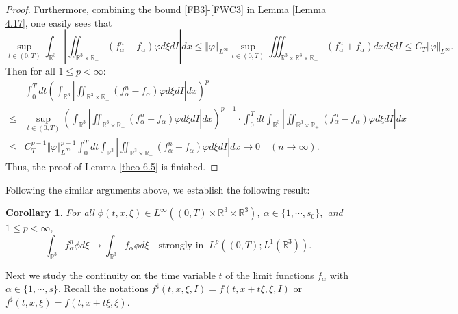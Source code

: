 \documentclass[reqno,11pt]{amsart}
\newtheorem{corollary}{Corollary}[section]
\numberwithin{equation}{section}
\def\R{\mathbb{R}}
\begin{document}
\begin{proof}
Furthermore, combining the bound \eqref{FB3}-\eqref{FWC3} in Lemma \ref{Lemma 4.17}, one easily sees that
	\begin{equation*}
		\sup_{t \in (0, T)} \int_{\R^3} |\iint_{ \R^3 \times \R_+} (f^n_\alpha -f_\alpha )\varphi d\xi dI|dx \leq \Vert \varphi \Vert_{L^\infty} \sup_{t \in (0, T)} \iiint_{ \R^3\times \R^3 \times \R_+} (f^n_\alpha +f_\alpha)dxd\xi dI \leq C_T\Vert \varphi \Vert_{L^\infty}.
	\end{equation*}
	Then for all $1\leq p<\infty$:
		\begin{align*}
			&\int_{0}^{T}dt (\int_{\R^3} |\iint_{ \R^3 \times \R_+} (f^n_\alpha -f_\alpha )\varphi d\xi dI|dx)^p \\
			\leq & \sup \limits_{t\in (0,T)} (\int_{\R^3} |\iint_{ \R^3 \times \R_+} (f^n_\alpha -f_\alpha )\varphi d\xi dI|dx)^{p-1} \cdot \int_{0}^{T}dt \int_{\R^3} |\iint_{ \R^3 \times \R_+} (f^n_\alpha -f_\alpha )\varphi d\xi dI|dx \\
			\leq &  C^{p-1}_T\Vert \varphi \Vert_{L^\infty}^{p-1} \int_{0}^{T}dt \int_{\R^3} |\iint_{ \R^3 \times \R_+} (f^n_\alpha -f_\alpha )\varphi d\xi dI|dx 
			\rightarrow  0 \quad (n \rightarrow \infty ).
		\end{align*}
	Thus, the proof of Lemma \ref{theo-6.5} is finished.
\end{proof}

Following the similar arguments above, we establish the following result:

\begin{corollary}\label{cor6.6}
	For all $\phi (t,x, \xi) \in L^\infty ((0,T)\times \R^3 \times \R^3 ) $,  $\alpha \in \{1,\cdots,s_0\},$ and $1\leq p<\infty $,
	\begin{equation*}
		\int_{ \R^3 } f^n_\alpha \phi d\xi  \rightarrow \int_{ \R^3 } f_\alpha \phi d\xi  \quad \text{strongly in }\  L^p((0,T);L^1(\R^3)).
	\end{equation*}
\end{corollary}

Next we study the continuity on the time variable $t$ of the limit functions $f_\alpha$ with $\alpha \in \{ 1, \cdots, s \}$. Recall the notations $f^\sharp (t,x, \xi, I) = f (t, x + t \xi, \xi, I)$ or $f^\sharp (t,x, \xi) = f (t, x + t \xi, \xi)$. 
\end{document}
